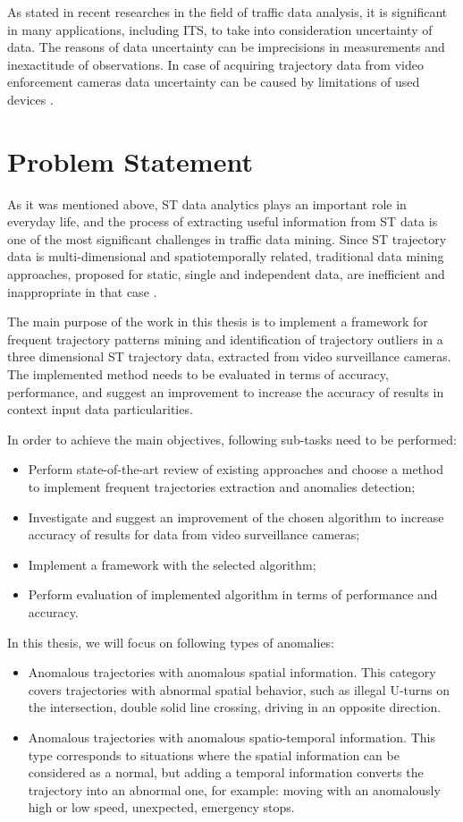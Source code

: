 As stated in recent researches in the field of traffic data analysis, it is significant in many applications, including ITS, to take into consideration uncertainty of data. The reasons of data uncertainty can be imprecisions in measurements and inexactitude of observations. In case of acquiring trajectory data from video enforcement cameras data uncertainty can be caused by limitations of used devices \cite{inproceedings:14_mpfstsp_gp_ud}.

\section{Problem Statement}

As it was mentioned above, ST data analytics plays an important role in everyday life, and the process of extracting useful information from ST data is one of the most significant challenges in traffic data mining. Since ST trajectory data is multi-dimensional and spatiotemporally related, traditional data mining approaches, proposed for static, single and independent data, are inefficient and inappropriate in that case \cite{article:8_review_mot_cl_alg}.

The main purpose of the work in this thesis is to implement a framework for frequent trajectory patterns mining and identification of trajectory outliers in a three dimensional ST trajectory data, extracted from video surveillance cameras. The implemented method needs to be evaluated in terms of accuracy, performance, and suggest an improvement to increase the accuracy of results in context input data particularities. 

In order to achieve the main objectives, following sub-tasks need to be performed:
\begin{itemize}
	\item Perform state-of-the-art review of existing approaches and choose a method to implement frequent trajectories extraction and anomalies detection;
	\item Investigate and suggest an improvement of the chosen algorithm to increase accuracy of results for data from video surveillance cameras;
	\item Implement a framework with the selected algorithm;
	\item Perform evaluation of implemented algorithm in terms of performance and accuracy.
\end{itemize}

In this thesis, we will focus on following types of anomalies:
\begin{itemize}
	\item Anomalous trajectories with anomalous spatial information. This category covers trajectories with abnormal spatial behavior, such as illegal U-turns on the intersection, double solid line crossing, driving in an opposite direction.
	\item Anomalous trajectories with anomalous spatio-temporal information. This type corresponds to situations where the spatial information can be considered as a normal, but adding a temporal information converts the trajectory into an abnormal one, for example: moving with an anomalously high or low speed, unexpected, emergency stops.
\end{itemize}


